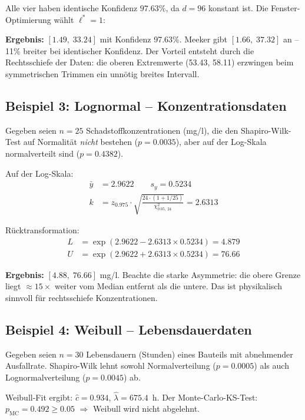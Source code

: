 \documentclass[10pt,a4paper,twocolumn]{article}
\theoremstyle{definition}
\begin{document}
Alle vier haben identische Konfidenz $97.63\%$, da $d = 96$ konstant ist.
Die Fenster-Optimierung wählt $\ell^* = 1$:

\textbf{Ergebnis:} $[1.49,\; 33.24]$ mit Konfidenz 97.63\%.
Meeker gibt $[1.66,\; 37.32]$ an -- 11\% breiter bei identischer Konfidenz.
Der Vorteil entsteht durch die Rechtsschiefe der Daten: die oberen
Extremwerte (53.43, 58.11) erzwingen beim symmetrischen Trimmen ein
unnötig breites Intervall.

\subsection{Beispiel 3: Lognormal -- Konzentrationsdaten}

Gegeben seien $n = 25$ Schadstoffkonzentrationen (mg/l),
die den Shapiro-Wilk-Test auf Normalität \emph{nicht} bestehen
($p = 0.0035$), aber auf der Log-Skala normalverteilt sind
($p = 0.4382$).

Auf der Log-Skala:
\begin{align*}
    \bar{y} &= 2.9622 \qquad s_y = 0.5234 \\[2pt]
    k &= z_{0.975} \cdot \sqrt{\frac{24 \cdot (1 + 1/25)}
         {\chi^2_{0.05,\,24}}} = 2.6313
\end{align*}

Rücktransformation:
\begin{align*}
    L &= \exp(2.9622 - 2.6313 \times 0.5234) = 4.879 \\
    U &= \exp(2.9622 + 2.6313 \times 0.5234) = 76.66
\end{align*}

\textbf{Ergebnis:} $[4.88,\; 76.66]$ mg/l.
Beachte die starke Asymmetrie: die obere Grenze liegt
$\approx 15\times$ weiter vom Median entfernt als die untere.
Das ist physikalisch sinnvoll für rechtsschiefe Konzentrationen.

\subsection{Beispiel 4: Weibull -- Lebensdauerdaten}

Gegeben seien $n = 30$ Lebensdauern (Stunden) eines Bauteils
mit abnehmender Ausfallrate. Shapiro-Wilk lehnt sowohl
Normalverteilung ($p = 0.0005$) als auch Lognormalverteilung
($p = 0.0045$) ab.

Weibull-Fit ergibt: $\hat{c} = 0.934$, $\hat{\lambda} = 675.4$~h.
Der Monte-Carlo-KS-Test: $p_{\text{MC}} = 0.492 \geq 0.05$
$\Rightarrow$ Weibull wird nicht abgelehnt.
\end{document}

